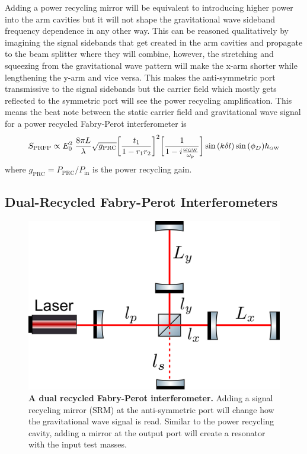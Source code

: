 		Adding a power recycling mirror will be equivalent to introducing higher power into the arm cavities but it will not shape the gravitational wave sideband frequency dependence in any other way.  This can be reasoned qualitatively by imagining the signal sidebands that get created in the arm cavities and propagate to the beam splitter where they will combine, however, the stretching and squeezing from the gravitational wave pattern will make the x-arm shorter while lengthening the y-arm and vice versa.  This makes the anti-symmetric port transmissive to the signal sidebands but the carrier field which mostly gets reflected to the symmetric port will see the power recycling amplification.  This means the beat note between the static carrier field and gravitational wave signal for a power recycled Fabry-Perot interferometer is
		\begin{equation}
		S_{\text{PRFP}} \propto E_0^2 \; \frac{8\pi L}{\lambda} \sqrt{g_{\text{PRC}}} \bigg[\frac{t_1}{1-r_1r_2}\bigg]^2 \bigg[\frac{1}{1 - i \frac{\omega_{\text{\tiny GW}}}{\omega_p}}\bigg] \sin{(k\delta l)} \sin{(\phi_{D})} h_{\text{\tiny GW}}
		\end{equation}
		where $g_{\text{PRC}} = P_{\text{PRC}}/P_{\text{in}}$ is the power recycling gain.
		
		\subsection{Dual-Recycled Fabry-Perot Interferometers}\label{sec:DRMI}
		
				\begin{figure}[ht]
			\centering
			\includegraphics[width=0.5 \textwidth]{../Figures/DRFP_Mich.png}
			\caption[A dual recycled Fabry-Perot interferometer.]{\textbf{A dual recycled Fabry-Perot interferometer.} Adding a signal recycling mirror (SRM) at the anti-symmetric port will change how the gravitational wave signal is read.  Similar to the power recycling cavity, adding a mirror at the output port will create a resonator with the input test masses.}
			\label{fig:DRFPMich}
		\end{figure}
		
